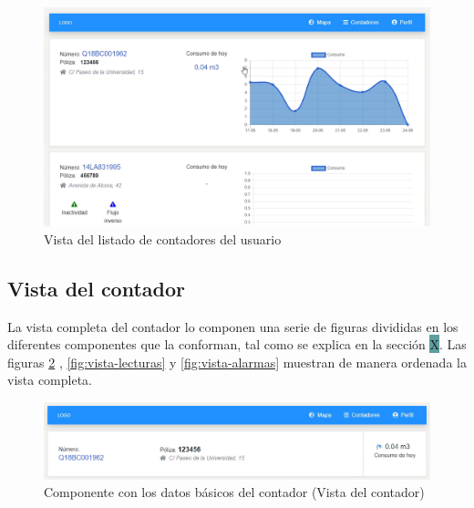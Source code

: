 \documentclass[pdftex,11pt,a4paper]{book}
\begin{document}
\begin{figure}[H]
 \centering
 \includegraphics [scale=0.52] {images/vistas/listado-contadores.png}
 \caption{Vista del listado de contadores del usuario} \label{fig:vista-lista-contadores}
 \end{figure}

\subsection{Vista del contador}

La vista completa del contador lo componen una serie de figuras divididas en los diferentes componentes que la conforman, tal como se explica en la sección \colorbox{CadetBlue}{X}. Las figuras \ref{fig:vista-contador} , \ref{fig:vista-lecturas} y \ref{fig:vista-alarmas} muestran de manera ordenada la vista completa.


\begin{figure}[h]
 \centering
 \includegraphics [scale=0.53] {images/vistas/contador.png}
 \caption{Componente con los datos básicos del contador (Vista del contador)} \label{fig:vista-contador}
 \end{figure}
 
\end{document}
